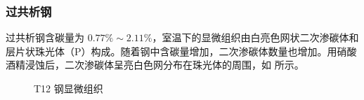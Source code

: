 \documentclass[a4paper,utf8]{article}
\begin{document}
    \subsubsection{过共析钢}
    过共析钢含碳量为 $0.77\%\sim 2.11\%$，室温下的显微组织由白亮色网状二次渗碳体和层片状珠光体（P）构成。随着钢中含碳量增加，二次渗碳体数量也增加。用硝酸酒精浸蚀后，二次渗碳体呈亮白色网分布在珠光体的周围，如 所示。
    \begin{figure}[!ht]
        \hspace{20pt}
        \hspace{20pt}
        \caption{T12 钢显微组织\label{fig:n4}}
    \end{figure}
\end{document}
